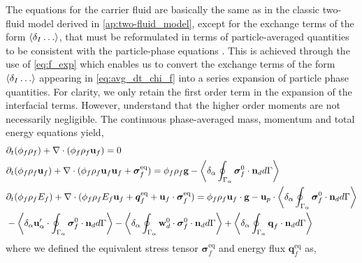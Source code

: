 The equations for the carrier fluid are basically the same as in the classic two-fluid model derived in \ref{ap:two-fluid_model}, except for the exchange terms of the form $\left<\delta_I \ldots \right>$, that must be reformulated in terms of particle-averaged quantities to be consistent with the particle-phase equations \citep{jackson1997locally,zhang1994averaged}. 
This is achieved through the use of \ref{eq:f_exp} which enables us to convert the exchange terms of the form $\left<\delta_I \ldots \right>$ appearing in \ref{eq:avg_dt_chi_f} into a series expansion of particle phase quantities. 
For clarity, we only retain the first order term in the expansion of the interfacial terms. 
However, understand that the higher order moments are not necessarily negligible. 
The continuous phase-averaged mass, momentum and total energy equations yield, 
\begin{align}
    \label{eq:dt_hybrid_rho}
    &\partial_t (\phi_f \rho_f)  
    + \mathbf{\nabla}\cdot (
        \phi_f \rho_f\textbf{u}_f
    )
    = 
    0\\
    \label{eq:dt_hybrid_rhou_f}
    &\partial_t (\phi_f \rho_f\textbf{u}_f)  
    + \mathbf{\nabla}\cdot (
        \phi_f \rho_f\textbf{u}_f\textbf{u}_f
        + \bm{\sigma}_f^\text{eq}
    )
    = 
    \phi_f \rho_f \textbf{g} 
    - \left<\delta_\alpha \oint_{\Gamma_\alpha} {\bm{\sigma}_f^0 \cdot \textbf{n}_d} d\Gamma\right>
    \\
    \label{eq:dt_hybrid_rhoE_f}
    &\partial_t (\phi_f\rho_fE_f)  
    + \mathbf{\nabla}\cdot (
        \phi_f\rho_fE_f\textbf{u}_f
        + \bm{q}_f^\text{eq}
        + \textbf{u}_f \cdot \bm{\sigma}_f^\text{eq}
        )
    = 
    \phi_f \rho_f\textbf{u}_f \cdot \textbf{g} 
    - \textbf{u}_p \cdot \left<\delta_\alpha \oint_{\Gamma_\alpha} {\bm{\sigma}_f^0 \cdot \textbf{n}_d} d\Gamma\right>\nonumber \\
    &- \left<\delta_\alpha  \textbf{u}_\alpha' \cdot \oint_{\Gamma_\alpha}   \bm{\sigma}_f^0 \cdot \textbf{n}_d d\Gamma\right>
    - \left<\delta_\alpha  \oint_{\Gamma_\alpha} \textbf{w}_d^0 \cdot \bm{\sigma}_f^0 \cdot \textbf{n}_d d\Gamma\right>
    + \left<\delta_\alpha \oint_{\Gamma_\alpha} {\textbf{q}_f\cdot \textbf{n}_d} d\Gamma\right>
\end{align} 
where we defined the equivalent stress tensor $\bm{\sigma}_f^\text{eq}$ and energy flux $\textbf{q}^\text{eq}_f$ as,
